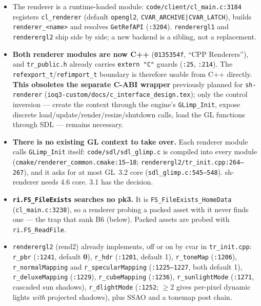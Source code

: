 \documentclass[11pt,a4paper]{article}
\begin{document}
\begin{itemize}
\item The renderer is a runtime-loaded module: \texttt{code/client/cl\_main.c:3184} registers
  \texttt{cl\_renderer} (default \texttt{opengl2}, \texttt{CVAR\_ARCHIVE|CVAR\_LATCH}), builds
  \texttt{renderer\_<name>} and resolves \texttt{GetRefAPI} (\texttt{:3204}). \texttt{renderergl1}
  and \texttt{renderergl2} ship side by side; a new backend is a sibling, not a replacement.
\item \textbf{Both renderer modules are now C++} (\texttt{0135354f}, ``CPP Renderers''), and
  \texttt{tr\_public.h} already carries \texttt{extern "C"} guards (\texttt{:25}, \texttt{:214}).
  The \texttt{refexport\_t}/\texttt{refimport\_t} boundary is therefore usable from C++ directly.
  \textbf{This obsoletes the separate C-ABI wrapper} previously planned for \texttt{sh-renderer}
  (\texttt{ioq3-custom/docs/c\_interface\_design.tex}); only the control inversion --- create the
  context through the engine's \texttt{GLimp\_Init}, expose discrete load/update/render/resize/shutdown
  calls, load the GL functions through SDL --- remains necessary.
\item \textbf{There is no existing GL context to take over.} Each renderer module calls
  \texttt{GLimp\_Init} itself: \texttt{code/sdl/sdl\_glimp.c} is compiled into every module
  (\texttt{cmake/renderer\_common.cmake:15--18}; \texttt{renderergl2/tr\_init.cpp:264--267}), and
  it asks for at most GL~3.2 core (\texttt{sdl\_glimp.c:545--548}). sh-renderer needs 4.6 core.
  3.1 has the decision.
\item \textbf{\texttt{ri.FS\_FileExists} searches no pk3.} It is
  \texttt{FS\_FileExists\_HomeData} (\texttt{cl\_main.c:3238}), so a renderer probing a packed
  asset with it never finds one --- the trap that sank B6 (below). Packed assets are probed with
  \texttt{ri.FS\_ReadFile}.
\item \texttt{renderergl2} (rend2) already implements, off or on by cvar in
  \texttt{tr\_init.cpp}: \texttt{r\_pbr} (\texttt{:1241}, default \textbf{0}), \texttt{r\_hdr}
  (\texttt{:1201}, default 1), \texttt{r\_toneMap} (\texttt{:1206}), \texttt{r\_normalMapping} and
  \texttt{r\_specularMapping} (\texttt{:1225--1227}, both default 1), \texttt{r\_deluxeMapping}
  (\texttt{:1229}), \texttt{r\_cubeMapping} (\texttt{:1236}), \texttt{r\_sunlightMode}
  (\texttt{:1271}, cascaded sun shadows), \texttt{r\_dlightMode} (\texttt{:1252}; $\geq 2$ gives
  per-pixel dynamic lights \emph{with} projected shadows), plus SSAO and a tonemap post chain.

\end{itemize}
\end{document}

